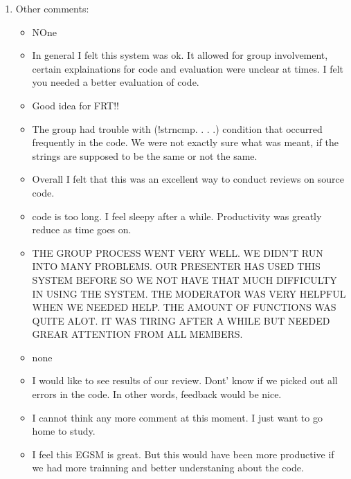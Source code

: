 \begin{enumerate}
\item Other comments:
\begin{itemize}
\item NOne
\item In general I felt this system was ok.  It allowed for group
involvement, certain explainations for code and evaluation were
unclear at times.  I felt you needed a better evaluation of code.
\item Good idea for FRT!!
\item The group had trouble with (!strncmp. . . .) condition that occurred
frequently in the code.  We were not exactly sure what was meant, if
the strings are supposed to be the same or not the same.
\item Overall I felt that this was an excellent way to conduct reviews on
source code.

\item code is too long.  I feel sleepy after a while.  Productivity was
greatly reduce as time goes on.
\item THE GROUP PROCESS WENT VERY WELL.  WE DIDN'T RUN INTO MANY PROBLEMS.
OUR PRESENTER HAS USED THIS SYSTEM BEFORE SO WE NOT HAVE THAT MUCH
DIFFICULTY IN USING THE SYSTEM.  THE MODERATOR WAS VERY HELPFUL WHEN
WE NEEDED HELP.  THE AMOUNT OF FUNCTIONS WAS QUITE ALOT.  IT WAS
TIRING AFTER A WHILE BUT NEEDED GREAR ATTENTION FROM ALL MEMBERS.
\item none

\item I would like to see results of our review.  Dont' know if
we picked out all errors in the code.  In other words, feedback
would be nice.
\item I cannot think any more comment at this moment.  I just want to go
home to study.
\item I feel this EGSM is great.
But this would have been more productive if we had
more trainning and better understaning about the code.

\end{itemize}


\end{enumerate}



